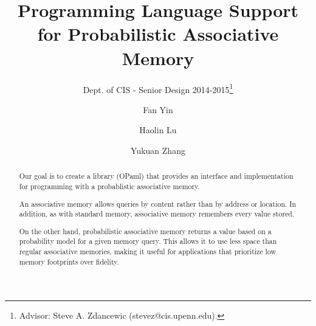 \documentclass{sig-alternate}
\begin{document}
 

\title{Programming Language Support for Probabilistic Associative Memory}
\subtitle{Dept. of CIS - Senior Design 2014-2015\thanks{Advisor: Steve A. Zdancewic (stevez@cis.upenn.edu).}}
\author{
    Fan Yin \\ 
    \and Haolin Lu \\ 
    \and Yukuan Zhang\\ 
}
%
%
\date{}
\maketitle

\begin{abstract}
    Our goal is to create a library (OPaml) that provides an interface and implementation 
    for programming with a probablistic associative memory. 
    
    An associative memory allows queries by content rather than by address or location.
    In addition, as with standard memory, associative memory remembers every value stored.

    On the other hand, probabilistic associative memory returns a value based on a probability model 
    for a given memory query. This allows it to use less space than regular
    associative memories, making it useful for applications that prioritize low memory footprints over 
    fidelity. 
    
\end{abstract}
\end{document}
